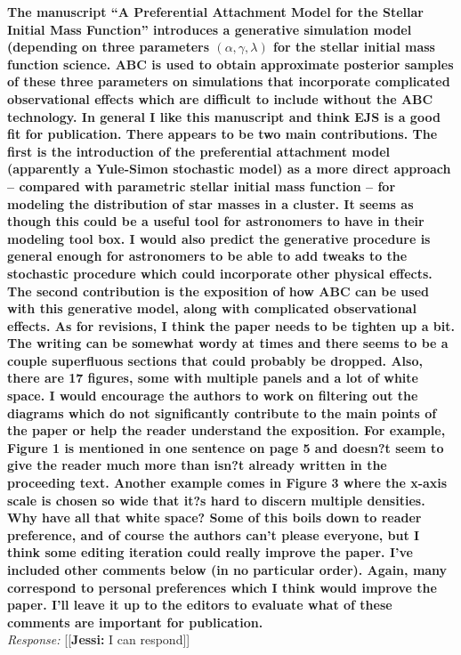 \documentclass[11pt, oneside]{article}   	%
\newcommand{\jessi}[1]{{\color{blue}[[\textbf{Jessi: }#1]]}}
\begin{document}
{\bf The manuscript ``A Preferential Attachment Model for the Stellar Initial Mass Function'' introduces a generative simulation model (depending on three parameters $(\alpha, \gamma, \lambda)$ for the stellar initial mass function science. ABC is used to obtain approximate posterior samples of these three parameters on simulations that incorporate complicated observational effects which are difficult to include without the ABC technology.
In general I like this manuscript and think EJS is a good fit for publication. There appears to be two main contributions. The first is the introduction of the preferential attachment model (apparently a Yule-Simon stochastic model) as a more direct approach -- compared with parametric stellar initial mass function -- for modeling the distribution of star masses in a cluster. It seems as though this could be a useful tool for astronomers to have in their modeling tool box. I would also predict the generative procedure is general enough for astronomers to be able to add tweaks to the stochastic procedure which could incorporate other physical effects. The second contribution is the exposition of how ABC can be used with this generative model, along with complicated observational effects.
As for revisions, I think the paper needs to be tighten up a bit. The writing can be somewhat wordy at times and there seems to be a couple superfluous sections that could probably be dropped. Also, there are 17 figures, some with multiple panels and a lot of white space. I would encourage the authors to work on filtering out the diagrams which do not significantly contribute to the main points of the paper or help the reader understand the exposition. For example, Figure 1 is mentioned in one sentence on page 5 and doesn?t seem to give the reader much more than isn?t already written in the proceeding text. Another example comes in Figure 3 where the x-axis scale is chosen so wide that it?s hard to discern multiple densities. Why have all that white space? Some of this boils down to reader preference, and of course the authors can't please everyone, but I think some editing iteration could really improve the paper. I've included other comments below (in no particular order). Again, many correspond to personal preferences which I think would improve the paper. I'll leave it up to the editors to evaluate what of these comments are important for publication.
} \\
\noindent \emph{Response:} \jessi{I can respond}
\bigskip


\\
\end{document}
